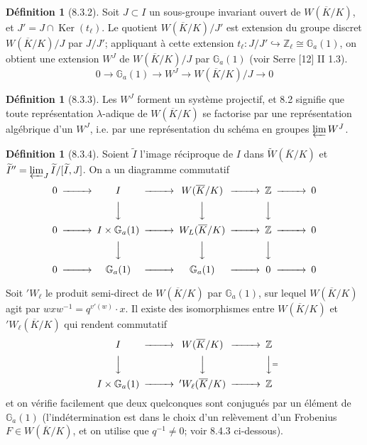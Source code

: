 \documentclass[11pt]{amsart}
\theoremstyle{plain}
\theoremstyle{definition}
\newtheorem{definition}[theorem]{D\'efinition}
\DeclareMathOperator{\Ker}{Ker}
\begin{document}
\begin{definition}[8.3.2]
Soit $J \subset I$ un sous-groupe invariant ouvert de $W(\overline{K}/K)$, et $J' = J \cap \Ker(t_\ell)$. Le quotient $W(\overline{K}/K)/J'$ est extension du groupe discret $W(\overline{K}/K)/J$ par $J/J'$; appliquant \`a cette extension $t_\ell: J/J' \hookrightarrow \mathbb{Z}_\ell \cong \mathbb{G}_a(1)$, on obtient une extension $W^J$ de $W(\overline{K}/K)/J$ par $\mathbb{G}_a(1)$ (voir Serre [12] II 1.3).
\[
0 \to \mathbb{G}_a(1) \to W^J \to W(\overline{K}/K)/J \to 0
\]
\end{definition}

\begin{definition}[8.3.3]
Les $W^J$ forment un syst\`eme projectif, et 8.2 signifie que toute repr\'esentation $\lambda$-adique de $W(\overline{K}/K)$ se factorise par une repr\'esentation alg\'ebrique d'un $W^J$, i.e. par une repr\'esentation du sch\'ema en groupes $\varprojlim W^J$.
\end{definition}

\begin{definition}[8.3.4]
Soient $\widetilde{I}$ l'image r\'eciproque de $I$ dans $\widetilde{W}(\overline{K}/K)$ et $\widetilde{I}'' = \varprojlim_J \widetilde{I}/[\widetilde{I},J]$. On a un diagramme commutatif
\[
\begin{CD}
0 @>>> I @>>> W(\overline{K}/K) @>>> \mathbb{Z} @>>> 0 \\
@. @VVV @VVV @VVV @. \\
0 @>>> I \times \mathbb{G}_a(1) @>>> W_L(\overline{K}/K) @>>> \mathbb{Z} @>>> 0 \\
@. @VVV @VVV @VVV @. \\
0 @>>> \mathbb{G}_a(1) @>>> \mathbb{G}_a(1) @>>> 0 @>>> 0
\end{CD}
\]
\end{definition}

Soit $'W_\ell$ le produit semi-direct de $W(\overline{K}/K)$ par $\mathbb{G}_a(1)$, sur lequel $W(\overline{K}/K)$ agit par $w x w^{-1} = q^{v'(w)} \cdot x$. Il existe des isomorphismes entre $W(\overline{K}/K)$ et $'W_\ell(\overline{K}/K)$ qui rendent commutatif
\[
\begin{CD}
I @>>> W(\overline{K}/K) @>>> \mathbb{Z} \\
@VVV @VVV @VV{=}V \\
I \times \mathbb{G}_a(1) @>>> 'W_\ell(\overline{K}/K) @>>> \mathbb{Z}
\end{CD}
\]
et on v\'erifie facilement que deux quelconques sont conjugu\'es par un \'el\'ement de $\mathbb{G}_a(1)$ (l'ind\'etermination est dans le choix d'un rel\`evement d'un Frobenius $F \in W(\overline{K}/K)$, et on utilise que $q^{-1} \not= 0$; voir 8.4.3 ci-dessous).
\end{document}
